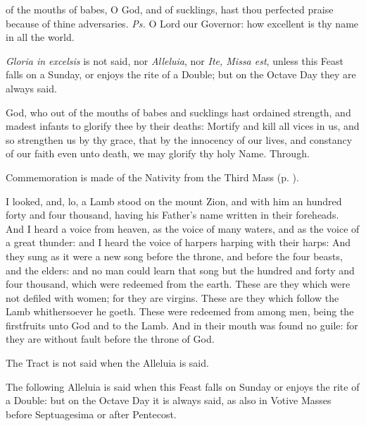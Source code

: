 \properantiphonfix

\introit
{} of the mouths of babes, O God, and of sucklings, hast thou perfected praise because of thine adversaries. \textit{Ps.} O Lord our Governor: how excellent is thy name in all the world.
\begin{rubric}
    \emph{Gloria in excelsis} is not said, nor \emph{Alleluia}, nor \emph{Ite, Missa est}, unless this Feast falls on a Sunday, or enjoys the rite of a  Double; but on the Octave Day they are always said.
\end{rubric}
\collect
{} God, who out of the mouths of babes and sucklings hast ordained strength, and madest infants to glorify thee by their deaths: Mortify and kill all vices in us, and so strengthen us by thy grace, that by the innocency of our lives, and constancy of our faith even unto death, we may glorify thy holy Name. Through.
\begin{rubric}
    Commemoration is made of the Nativity from the Third Mass (p. \pageref{NativityMassIIICollect}).
\end{rubric}
 I looked, and, lo, a Lamb stood on the mount Zion, and with him an hundred forty and four thousand, having his Father's name written in their foreheads. And I heard a voice from heaven, as the voice of many waters, and as the voice of a great thunder: and I heard the voice of harpers harping with their harps: And they sung as it were a new song before the throne, and before the four beasts, and the elders: and no man could learn that song but the hundred and forty and four thousand, which were redeemed from the earth. These are they which were not defiled with women; for they are virgins. These are they which follow the Lamb whithersoever he goeth. These were redeemed from among men, being the firstfruits unto God and to the Lamb. And in their mouth was found no guile: for they are without fault before the throne of God.
\begin{rubric}
     The Tract is not said when the Alleluia is said.
\end{rubric}
\begin{rubric}
    The following Alleluia is said when this Feast falls on Sunday or enjoys the rite of a  Double: but on the Octave Day it is always said, as also in Votive Masses before Septuagesima or after Pentecost.
\end{rubric}
